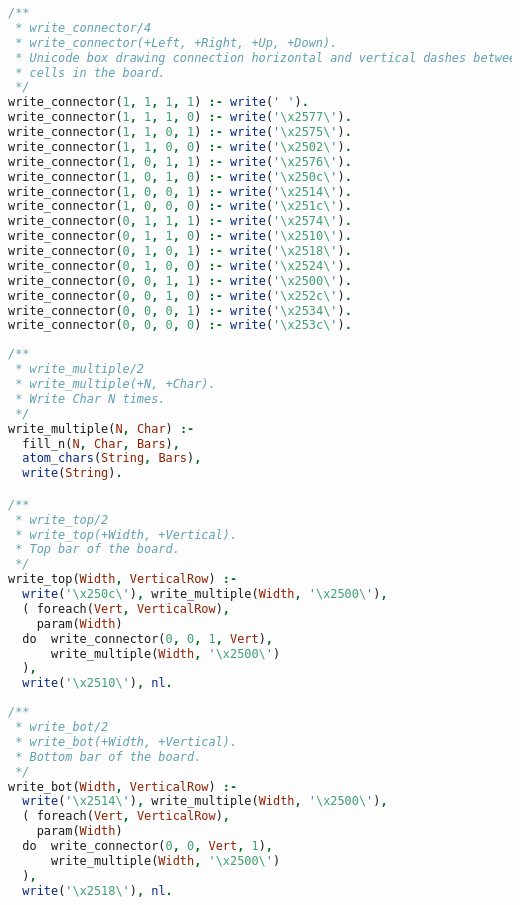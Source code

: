 \documentclass[runningheads]{llncs}
\begin{document}
\begin{center}
\begin{minipage}{0.85\textwidth}
\centering\ttfamily
\begin{lstlisting}[language=Prolog]
/**
 * write_connector/4
 * write_connector(+Left, +Right, +Up, +Down).
 * Unicode box drawing connection horizontal and vertical dashes between
 * cells in the board.
 */
write_connector(1, 1, 1, 1) :- write(' ').
write_connector(1, 1, 1, 0) :- write('\x2577\').
write_connector(1, 1, 0, 1) :- write('\x2575\').
write_connector(1, 1, 0, 0) :- write('\x2502\').
write_connector(1, 0, 1, 1) :- write('\x2576\').
write_connector(1, 0, 1, 0) :- write('\x250c\').
write_connector(1, 0, 0, 1) :- write('\x2514\').
write_connector(1, 0, 0, 0) :- write('\x251c\').
write_connector(0, 1, 1, 1) :- write('\x2574\').
write_connector(0, 1, 1, 0) :- write('\x2510\').
write_connector(0, 1, 0, 1) :- write('\x2518\').
write_connector(0, 1, 0, 0) :- write('\x2524\').
write_connector(0, 0, 1, 1) :- write('\x2500\').
write_connector(0, 0, 1, 0) :- write('\x252c\').
write_connector(0, 0, 0, 1) :- write('\x2534\').
write_connector(0, 0, 0, 0) :- write('\x253c\').
\end{lstlisting}
\end{minipage}
\end{center}

\begin{center}
\begin{minipage}{0.85\textwidth}
\centering\ttfamily
\begin{lstlisting}[language=Prolog]
/**
 * write_multiple/2
 * write_multiple(+N, +Char).
 * Write Char N times.
 */
write_multiple(N, Char) :-
  fill_n(N, Char, Bars),
  atom_chars(String, Bars),
  write(String).

/**
 * write_top/2
 * write_top(+Width, +Vertical).
 * Top bar of the board. 
 */
write_top(Width, VerticalRow) :-
  write('\x250c\'), write_multiple(Width, '\x2500\'),
  ( foreach(Vert, VerticalRow),
    param(Width)
  do  write_connector(0, 0, 1, Vert),
      write_multiple(Width, '\x2500\')
  ),
  write('\x2510\'), nl.
\end{lstlisting}
\end{minipage}
\end{center}

\begin{center}
\begin{minipage}{0.85\textwidth}
\centering\ttfamily
\begin{lstlisting}[language=Prolog]
/**
 * write_bot/2
 * write_bot(+Width, +Vertical).
 * Bottom bar of the board.
 */
write_bot(Width, VerticalRow) :-
  write('\x2514\'), write_multiple(Width, '\x2500\'),
  ( foreach(Vert, VerticalRow),
    param(Width)
  do  write_connector(0, 0, Vert, 1),
      write_multiple(Width, '\x2500\')
  ),
  write('\x2518\'), nl.
\end{lstlisting}
\end{minipage}
\end{center}
\end{document}
